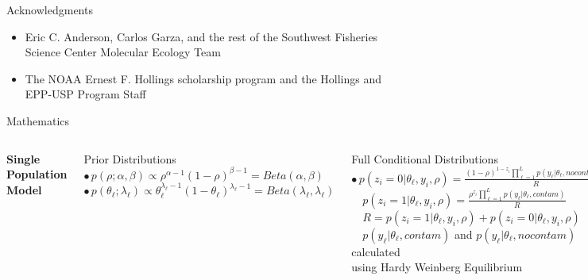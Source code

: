 \documentclass[letter,graphicx]{beamer}
\begin{document}
\begin{frame}{Acknowledgments}
\begin{itemize}
\item Eric C. Anderson, Carlos Garza, and the rest of the Southwest Fisheries Science Center Molecular Ecology Team
\vspace{4mm}
\item The NOAA Ernest F. Hollings scholarship program and the Hollings and EPP-USP Program Staff
\end{itemize}
\end{frame}

\begin{frame}{Mathematics}
\begin{tiny}
\begin{columns}[T]

\column{2.25in}
\centerline{\textbf{Single Population Model}}
\vspace{2mm}
Prior Distributions \\ \vspace{1mm}
$\bullet \, p(\rho;\alpha,\beta) \propto \rho^{\alpha - 1}(1 - \rho)^{\beta - 1} = Beta(\alpha, \beta)$ \\ \vspace{1mm}
$\bullet \, p(\theta_{\ell};\lambda_{\ell}) \propto \theta_{\ell}^{\lambda_{\ell}-1}(1 - \theta_{\ell})^{\lambda_{\ell}-1} = Beta(\lambda_{\ell},\lambda_{\ell})$ \\ 
\vspace{2mm}

Full Conditional Distributions \\ \vspace{1mm}
$\bullet \, p(z_i=0|\theta_{\ell},y_i,\rho) = \frac{(1-\rho)^{1-z_i}\prod_{\ell=1}^{L} p(y_{\ell}|\theta_{\ell},nocontam)}{R}$ \\ \vspace{1mm}
$\quad p(z_i=1|\theta_{\ell},y_i,\rho) = \frac{\rho^{z_i}\prod_{\ell=1}^{L} p(y_{\ell}|\theta_{\ell},contam)}{R}$ \\ \vspace{1mm}
$\quad R = p(z_i=1|\theta_{\ell},y_i,\rho) + p(z_i = 0|\theta_{\ell},y_i,\rho)$ \\ \vspace{1mm}
$\quad p(y_{\ell}|\theta_{\ell},contam)$ and $p(y_{\ell}|\theta_{\ell},nocontam)$ calculated  \\  \vspace{1mm}
\quad using Hardy Weinberg Equilibrium \\  \vspace{1mm}


\end{columns}
\end{tiny}
\end{frame}
\end{document}
